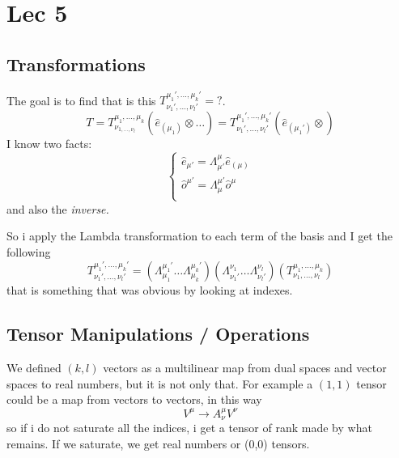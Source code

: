 \section{Lec 5}
\subsection{Transformations}
The goal is to find that is this $T^{\mu_{1}', \ldots , \mu_{k}'}_{\nu_{1}', \ldots , \nu_{l}'}= ?$.
\begin{equation}
T = T^{\mu_{1}, \ldots , \mu_{k}}_{\nu_{1, \ldots , \nu_{l}}} \left( \hat{e}_{\left( \mu_{1} \right)} \otimes \ldots  \right) = T^{\mu_{1}', \ldots , \mu_{k}'}_{\nu_{1}', \ldots , \nu_{l}'} \left( \hat{e}_{\left( \mu_{1}' \right)} \otimes  \right)
\end{equation}
I know two facts:
\begin{equation}
\begin{cases}
\hat{e}_{\mu '} = \Lambda^{\mu }_{\mu '} \hat{e}_{\left( \mu  \right)} \\
\hat{o}^{\mu '} = \Lambda^{\mu' }_{\mu } \hat{o}^{\mu } \\
\end{cases}
\end{equation}
and also the \emph{inverse.} \par

So i apply the Lambda transformation to each term of the basis and I get the following
\begin{equation}
T^{\mu_{1}', \ldots , \mu_{k}'}_{\nu_{1}', \ldots , \nu_{l}' } = \left( \Lambda^{\mu_{1}'}_{\mu_{1}} \ldots \Lambda^{\mu_{k}'}_{\mu_{k}} \right) \left( \Lambda^{\nu_{1}}_{\nu_{1}'} \ldots  \Lambda^{\nu_{l}}_{\nu_{l}'} \right) \left( T^{\mu_{1}, \ldots , \mu_{k}}_{\nu_{1}, \ldots , \nu_{l}} \right)
\end{equation}
that is something that was obvious by looking at indexes.

\subsection{Tensor Manipulations / Operations}
We defined $\left( k,l \right)$ vectors as a multilinear map from dual spaces and vector spaces to real numbers, but it is not only that. For example a $\left( 1,1 \right)$ tensor could be a map from vectors to vectors, in this way
\begin{equation}
V^{\mu } \to A^{\mu }_{\nu } V^{\nu }
\end{equation}
so if i do not saturate all the indices, i get a tensor of rank made by what remains. If we saturate, we get real numbers or (0,0) tensors.

